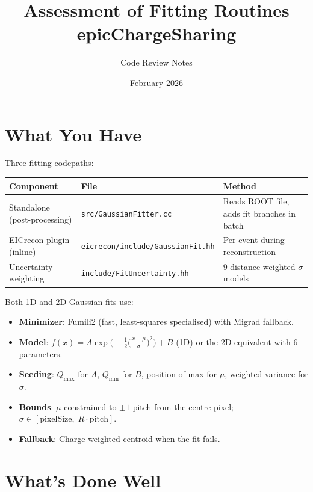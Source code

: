 \documentclass[11pt,a4paper]{article}
\title{Assessment of Fitting Routines\\[4pt]
       \large epicChargeSharing}
\author{Code Review Notes}
\date{February 2026}
\newcommand{\file}[1]{\texttt{#1}}
\begin{document}
\maketitle

\section{What You Have}

Three fitting codepaths:

\begin{table}[h]
\centering
\begin{tabular}{@{}lll@{}}
\toprule
\textbf{Component} & \textbf{File} & \textbf{Method} \\
\midrule
Standalone (post-processing) & \file{src/GaussianFitter.cc}          & Reads ROOT file, adds fit branches in batch \\
EICrecon plugin (inline)     & \file{eicrecon/include/GaussianFit.hh} & Per-event during reconstruction \\
Uncertainty weighting        & \file{include/FitUncertainty.hh}       & 9 distance-weighted $\sigma$ models \\
\bottomrule
\end{tabular}
\end{table}

\noindent
Both 1D and 2D Gaussian fits use:
\begin{itemize}[nosep]
  \item \textbf{Minimizer}: Fumili2 (fast, least-squares specialised) with Migrad fallback.
  \item \textbf{Model}:
    $f(x) = A \exp\!\bigl(-\tfrac{1}{2}\bigl(\tfrac{x-\mu}{\sigma}\bigr)^{2}\bigr) + B$
    \;(1D) or the 2D equivalent with 6 parameters.
  \item \textbf{Seeding}: $Q_{\max}$ for $A$, $Q_{\min}$ for $B$,
    position-of-max for $\mu$, weighted variance for $\sigma$.
  \item \textbf{Bounds}: $\mu$ constrained to $\pm 1$ pitch from the
    centre pixel; $\sigma \in [\text{pixelSize},\; R \cdot \text{pitch}]$.
  \item \textbf{Fallback}: Charge-weighted centroid when the fit fails.
\end{itemize}

\section{What's Done Well}
\end{document}
